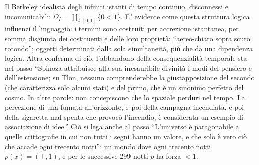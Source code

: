 \begin{example}
  Il Berkeley idealista degli infiniti istanti di tempo continuo, disconnessi e incomunicabili: $\Omega_I = \coprod_{t : [0,1]} \{ 0 < 1 \}$. E' evidente come questa struttura logica influenzi il linguaggio: i termini sono costruiti per accrezione istantanea, per somma disgiunta dei costituenti e delle loro proprietà: ``aereo-chiaro sopra scuro rotondo''; oggetti determinati dalla sola simultaneità, più che da una dipendenza logica. Altra conferma di ciò, l'abbandono della consequenzialità temporale sta nel passo ``Spinoza attribuisce alla sua inesauribile divinità i modi del pensiero e dell'estensione; su Tlön, nessuno comprenderebbe la giustapposizione del  secondo (che caratterizza solo alcuni stati) e del primo, che è un sinonimo  perfetto del cosmo. In altre parole: non concepiscono che lo spaziale perduri  nel tempo. La percezione di una fumata all'orizzonte, e poi della campagna  incendiata, e poi della sigaretta mal spenta che provocò l'incendio, è  considerata un esempio di associazione di idee.'' Ciò si lega anche al passo ``L'universo è paragonabile a quelle crittografie in cui non tutti i segni hanno un valore, e che solo è vero ciò che accade ogni trecento notti'': un mondo dove ogni trecento notti $p(x) =(\top,1)$, e per le successive 299 notti $p$ ha forza $<1$.
\end{example}
\begin{example}
  
\end{example}
